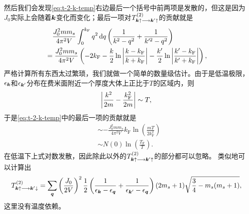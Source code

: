 \documentclass[hyperref, UTF8, a4paper]{ctexart}
\begin{document}
然后我们会发现\eqref{eq:t-2-k-temp}右边最后一个括号中前两项是发散的，但这是因为$J_0$实际上会随着$\vb*{k}$变化而变化；最后一项对$T^{(2)}_{\vb*{k} \uparrow \longrightarrow \vb*{k}' \uparrow}$的贡献就是
\[
    \begin{aligned}
        &\quad \frac{J_0^2 m m_s}{4\pi^2 V} \int_0^{k_\text{F}} q^2 \dd{q} \left( \frac{1}{k^2 - q^2} + \frac{1}{k'^2 - q^2} \right) \\
        &= \frac{J_0^2 m m_s}{4\pi^2 V} \left( - 2 k_\text{F} - \frac{k}{2} \ln \abs{\frac{k-k_\text{F}}{k+k_\text{F}}} - \frac{k'}{2} \ln \abs{\frac{k'-k_\text{F}}{k'+k_\text{F}}} \right),
    \end{aligned}
\]
严格计算所有东西太过繁琐，我们就做一个简单的数量级估计。由于是低温极限，$\epsilon_{\vb*{k}}$和$\epsilon_{\vb*{k}'}$分布在费米面附近一个厚度大体上正比于$T$的区域内，则
\[
    \abs{\frac{k^2}{2m} - \frac{k_\text{F}^2}{2m}} \sim T,
\]
于是\eqref{eq:t-2-k-temp}中的最后一项的贡献就是
\[
    \begin{aligned}
        & \sim - \frac{J_0^2 m m_s}{4\pi^2 V} k_\text{F} \ln \left( \frac{m T}{2 k_\text{F}^2} \right) \\
        & \sim N(0) \ln(\frac{T_\text{F}}{T}).
    \end{aligned}
\]
在低温下上式对数发散，因此除此以外的$T^{(2)}_{\vb*{k} \uparrow \longrightarrow \vb*{k}' \uparrow}$的部分都可以忽略。
类似地可以计算出
\begin{equation}
    T^{(2)}_{\vb*{k} \uparrow \longrightarrow \vb*{k}' \downarrow} = \sum_{\vb*{q}} \left( \frac{J_0}{2V} \right)^2 \frac{1}{2} \left( \frac{1}{\epsilon_{\vb*{k}} - \epsilon_{\vb*{q}}} + \frac{1}{\epsilon_{\vb*{k}'} - \epsilon_{\vb*{q}}} \right) (2 m_s + 1) \sqrt{\frac{3}{4} - m_s (m_s + 1)},
\end{equation}
这里没有温度依赖。
\end{document}

